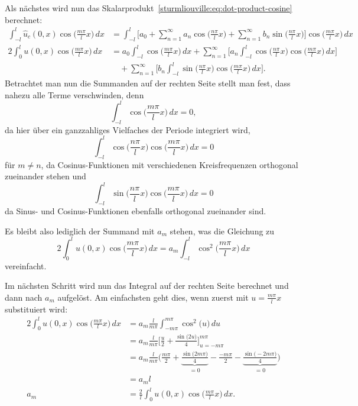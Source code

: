 Als nächstes wird nun das
Skalarprodukt~\eqref{sturmliouville:eq:dot-product-cosine} berechnet:
\[
\begin{aligned}
    \int_{-l}^{l}\hat{u}_c(0, x)\cos\biggl(\frac{m \pi}{l}x\biggr)\,dx
    &=
    \int_{-l}^{l} \biggl[a_0
    +
    \sum_{n = 1}^{\infty} a_n\cos\biggl(\frac{n\pi}{l}x\biggr)
    +
    \sum_{n = 1}^{\infty} b_n\sin\biggl(\frac{n\pi}{l}x\biggr)\biggr]
    \cos\biggl(\frac{m \pi}{l}x\biggr) \,dx
    \\
    2\int_{0}^{l}u(0, x)\cos\biggl(\frac{m \pi}{l}x\biggr)\,dx
    &=
    a_0 \int_{-l}^{l}\cos\biggl(\frac{m \pi}{l}x\biggr) \,dx
    +
    \sum_{n = 1}^{\infty}\biggl[a_n\int_{-l}^{l}\cos\biggl(\frac{n\pi}{l}x\biggr)
        \cos\biggl(\frac{m \pi}{l}x\biggr)\,dx\biggr]
    \\
    &\quad +
    \sum_{n = 1}^{\infty}\biggl[b_n\int_{-l}^{l}\sin\biggl(\frac{n\pi}{l}x\biggr)
        \cos\biggl(\frac{m \pi}{l}x\biggr)\,dx\biggr].
\end{aligned}
\]
Betrachtet man nun die Summanden auf der rechten Seite stellt man fest, dass
nahezu alle Terme verschwinden, denn
\[
    \int_{-l}^{l}\cos\biggl(\frac{m \pi}{l}x\biggr) \,dx
    =
    0,
\]
da hier über ein ganzzahliges Vielfaches der Periode integriert wird,
\[
    \int_{-l}^{l}\cos\biggl(\frac{n\pi}{l}x\biggr)
    \cos\biggl(\frac{m \pi}{l}x\biggr)\,dx
    =
    0
\]
für $m\neq n$, da Cosinus-Funktionen mit verschiedenen Kreisfrequenzen
orthogonal zueinander stehen und
\[
    \int_{-l}^{l}\sin\biggl(\frac{n\pi}{l}x\biggr)
        \cos\biggl(\frac{m \pi}{l}x\biggr)\,dx
    =
    0
\]
da Sinus- und Cosinus-Funktionen ebenfalls orthogonal zueinander sind.

Es bleibt also lediglich der Summand mit $a_m$ stehen, was die Gleichung zu
\[
    2\int_{0}^{l}u(0, x)\cos\biggl(\frac{m \pi}{l}x\biggr)\,dx
    =
    a_m\int_{-l}^{l}\cos^2\biggl(\frac{m\pi}{l}x\biggr)\,dx
\]
vereinfacht.

Im nächsten Schritt wird nun das Integral auf der rechten Seite
berechnet und dann nach $a_m$ aufgelöst.
Am einfachsten geht dies, wenn zuerst mit $u = \frac{m \pi}{l}x$ substituiert
wird:
\[
    \begin{aligned}
    2\int_{0}^{l}u(0, x)\cos\biggl(\frac{m \pi}{l}x\biggr)\,dx
    &=
    a_m\frac{l}{m\pi}\int_{-m\pi}^{m\pi}\cos^2\biggl(u\biggr)\,du
    \\
    &=
    a_m\frac{l}{m\pi}\biggl[\frac{u}{2} + 
    \frac{\sin\biggl(2u\biggr)}{4}\biggl]_{u=-m\pi}^{m\pi}
    \\
    &=
    a_m\frac{l}{m\pi}\biggl(\frac{m\pi}{2} + 
    \underbrace{\frac{\sin\biggl(2m\pi\biggr)}{4}}_{\displaystyle = 0} - 
    \frac{-m\pi}{2} -
    \underbrace{\frac{\sin\biggl(-2m\pi\biggr)}{4}}_{\displaystyle = 0}\biggr)
    \\
    &=
    a_m l
    \\
    a_m
    &=
    \frac{2}{l} \int_{0}^{l}u(0, x)\cos\biggl(\frac{m \pi}{l}x\biggr)\,dx.
    \end{aligned}
\]

